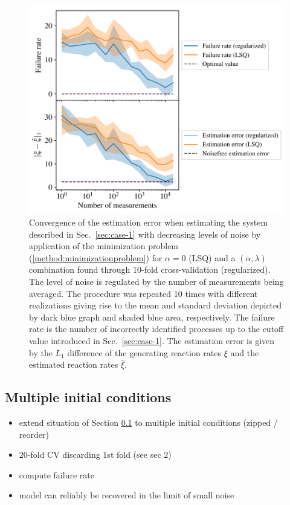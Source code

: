 \documentclass[oneside, abstracton, titlepage]{scrartcl}
\begin{document}
	\begin{figure}
		\centering
		\includegraphics[width=.7\columnwidth]{./figures_tex/case2}
		\caption{Convergence of the estimation error when estimating the system described in Sec.~\ref{sec:case-1} with decreasing levels of noise by application of the minimization problem (\ref{method:minimizationproblem}) for $\alpha=0$ (LSQ) and a $(\alpha, \lambda)$ combination found through $10$-fold cross-validation (regularized). The level of noise is regulated by the number of measurements being averaged. The procedure was repeated 10 times with different realizations giving rise to the mean and standard deviation depicted by dark blue graph and shaded blue area, respectively. The failure rate is the number of incorrectly identified processes up to the cutoff value introduced in Sec.~\ref{sec:case-1}. The estimation error is given by the $L_1$ difference of the generating reaction rates $\xi$ and the estimated reaction rates $\hat{\xi}$.}
		\label{fig:case2-convergence}
	\end{figure}

	\subsection{Multiple initial conditions}\label{sec:case-3}
	
	\begin{itemize}
		\item extend situation of Section \ref{sec:case-3} to multiple initial conditions (zipped / reorder)
		\item $20$-fold CV discarding 1st fold (see sec 2)
		\item compute failure rate
		\item model can reliably be recovered in the limit of small noise
	\end{itemize}
\end{document}
